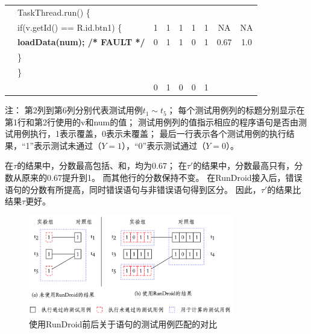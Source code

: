 \begin{table}[!ht]
\begin{center}
\begin{tabular}{|rl*{5} {|c}|c|c|}
			&TaskThread.run() \{                             &   &   &   &   &   &      &       \\
			
			&\quad if(v.getId() == R.id.btn1) \{                          & 1 & 1 & 1 & 1 & 1 &  NA   & NA \\
			
			&\quad \quad \textbf{loadData(num); /* FAULT */} & 0 & 1 & 1 & 0 & 1 & 0.67    & 1.0  \\
			
			&\quad\}                                         &   &   &   &   &   &  &                \\
			
			&\}                                              &   &   &   &   &   &   &              \\
			
			\hline
			
			&                                                  & 0 & 1 & 0 & 0 & 1 &   &               \\
									\hline
		\end{tabular}
	\end{center}
\tiny
	注： 第2列到第6列分别代表测试用例$t_1\sim t_5$；
	每个测试用例列的标题分别显示在第1行和第2行使用的v和num的值；
	测试用例列的值指示相应的程序语句是否由测试用例执行，1表示覆盖，0表示未覆盖；   
	最后一行表示各个测试用例的执行结果，“1”表示测试未通过（$Y=1$），“0”表示测试通过（$Y=0$）。  \par
	
	
\end{table}





在$\tau$的结果中，分数最高包括、和，均为0.67；
在$\tau'$的结果中，分数最高只有，分数从原来的0.67提升到1。
而其他行的分数保持不变。
在RunDroid接入后，错误语句的分数有所提高，同时错误语句与非错误语句得到区分。
因此，$\tau'$的结果比结果$\tau$更好。


\begin{figure}[!ht]
	\begin{center}
		\includegraphics[width=0.8\textwidth]{./Figures/fault-localization.png}
	\end{center}
	\caption{使用RunDroid前后关于语句的测试用例匹配的对比}
	\label{fig:motivationResultTreatment}
\end{figure}


